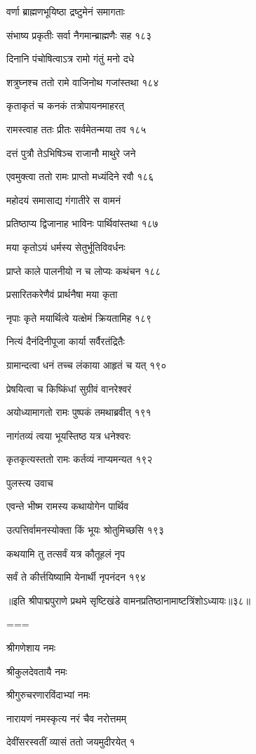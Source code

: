 वर्णा ब्राह्मणभूयिष्ठा द्रष्टुमेनं समागताः

संभाष्य प्रकृतीः सर्वा नैगमान्ब्राह्मणैः सह १८३

दिनानि पंचोषित्वाऽत्र रामो गंतुं मनो दधे

शत्रुघ्नश्च ततो रामे वाजिनोथ गजांस्तथा १८४

कृताकृतं च कनकं तत्रोपायनमाहरत्

रामस्त्वाह ततः प्रीतः सर्वमेतन्मया तव १८५

दत्तं पुत्रौ तेऽभिषिञ्च राजानौ माथुरे जने

एवमुक्त्वा ततो रामः प्राप्तो मध्यंदिने रवौ १८६

महोदयं समासाद्य गंगातीरे स वामनं

प्रतिष्ठाप्य द्विजानाह भाविनः पार्थिवांस्तथा १८७

मया कृतोऽयं धर्मस्य सेतुर्भूतिविवर्धनः

प्राप्ते काले पालनीयो न च लोप्यः कथंचन १८८

प्रसारितकरेणैवं प्रार्थनैषा मया कृता

नृपाः कृते मयार्थित्वे यत्क्षेमं क्रियतामिह १८९

नित्यं दैनंदिनीपूजा कार्या सर्वैरतंद्रितैः

ग्रामान्दत्वा धनं तच्च लंकाया आहृतं च यत् १९०

प्रेषयित्वा च किष्किंधां सुग्रीवं वानरेश्वरं

अयोध्यामागतो रामः पुष्पकं तमथाब्रवीत् १९१

नागंतव्यं त्वया भूयस्तिष्ठ यत्र धनेश्वरः

कृतकृत्यस्ततो रामः कर्तव्यं नाप्यमन्यत १९२

पुलस्त्य उवाच

एवन्ते भीष्म रामस्य कथायोगेन पार्थिव

उत्पत्तिर्वामनस्योक्ता किं भूयः श्रोतुमिच्छसि १९३

कथयामि तु तत्सर्वं यत्र कौतूहलं नृप

सर्वं ते कीर्त्तयिष्यामि येनार्थी नृपनंदन १९४ 

॥इति श्रीपाद्मपुराणे प्रथमे सृष्टिखंडे वामनप्रतिष्ठानामाष्टत्रिंशोऽध्यायः॥३८॥


===



श्रीगणेशाय नमः

श्रीकुलदेवतायै नमः

श्रीगुरुचरणारविंदाभ्यां नमः

नारायणं नमस्कृत्य नरं चैव नरोत्तमम्

देवींसरस्वतीं व्यासं ततो जयमुदीरयेत् १


